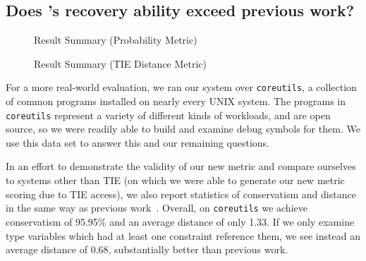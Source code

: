 \subsection{Does \bitr's recovery ability exceed previous work?}
\label{subsec:evalprev}
\begin{figure}
\caption{Result Summary (Probability Metric)}
\label{bitr:fig:results-prob}
\end{figure}
\begin{figure}
\caption{Result Summary (TIE Distance Metric)}
\label{bitr:fig:results-tie}
\end{figure}

For a more real-world evaluation, we ran our system over \texttt{coreutils}, a collection of common programs installed on nearly every UNIX system. The programs in \texttt{coreutils} represent a variety of different kinds of workloads, and are open source, so we were readily able to build and examine debug symbols for them. We use this data set to answer this and our remaining questions.

In an effort to demonstrate the validity of our new metric and compare ourselves to systems other than TIE (on which we were able to generate our new metric scoring due to TIE access), we also report statistics of conservatism and distance in the same way as previous work~\cite{tie,sw}. Overall, on \texttt{coreutils} we achieve conservatism of 95.95\% and an average distance of only 1.33. If we only examine type variables which had at least one constraint reference them, we see instead an average distance of 0.68, substantially better than previous work.

